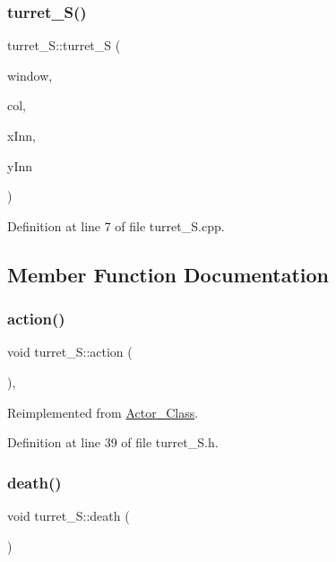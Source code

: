 \subsubsection{\texorpdfstring{turret\+\_\+\+S()}{turret\_S()}}
{\footnotesize\ttfamily turret\+\_\+\+S\+::turret\+\_\+S (\begin{DoxyParamCaption}\item[{sf\+::\+Render\+Window \&}]{window,  }\item[{\hyperlink{class_collision}{Collision}}]{col,  }\item[{int}]{x\+Inn,  }\item[{int}]{y\+Inn }\end{DoxyParamCaption})}



Definition at line 7 of file turret\+\_\+\+S.\+cpp.



\subsection{Member Function Documentation}
\hypertarget{classturret___s_a34ce31ab5648dab8b5cfb7c94d96cf3a}{}\label{classturret___s_a34ce31ab5648dab8b5cfb7c94d96cf3a} 
\subsubsection{\texorpdfstring{action()}{action()}}
{\footnotesize\ttfamily void turret\+\_\+\+S\+::action (\begin{DoxyParamCaption}{ }\end{DoxyParamCaption})\hspace{0.3cm}{\ttfamily [inline]}, {\ttfamily [virtual]}}



Reimplemented from \hyperlink{class_actor___class_ab8e23ffae108da3b8eda67c6753bdae0}{Actor\+\_\+\+Class}.



Definition at line 39 of file turret\+\_\+\+S.\+h.

\hypertarget{classturret___s_a14320bc891a632978c4808bcb385e4b1}{}\label{classturret___s_a14320bc891a632978c4808bcb385e4b1} 
\subsubsection{\texorpdfstring{death()}{death()}}
{\footnotesize\ttfamily void turret\+\_\+\+S\+::death (\begin{DoxyParamCaption}{ }\end{DoxyParamCaption})\hspace{0.3cm}{\ttfamily [virtual]}}



